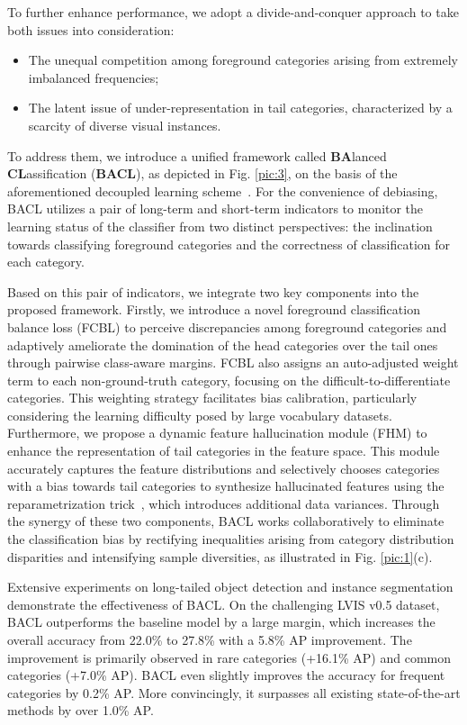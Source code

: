 \documentclass[lettersize,journal]{IEEEtran}
\begin{document}
To further enhance performance, we adopt a divide-and-conquer approach to take both issues into consideration:
\begin{itemize}
    \item The unequal competition among foreground categories arising from extremely imbalanced frequencies;
    \item The latent issue of under-representation in tail categories, characterized by a scarcity of diverse visual instances.
\end{itemize}
To address them, we introduce a unified framework called \textbf{BA}lanced \textbf{CL}assification (\textbf{BACL}), as depicted in Fig. \ref{pic:3}, on the basis of the aforementioned decoupled learning scheme~\cite{kang2019decoupling}.
For the convenience of debiasing, BACL utilizes a pair of long-term and short-term indicators to monitor the learning status of the classifier from two distinct perspectives: the inclination towards classifying foreground categories and the correctness of classification for each category.

Based on this pair of indicators, we integrate two key components into the proposed framework.
Firstly, we introduce a novel foreground classification balance loss (FCBL) to perceive discrepancies among foreground categories and adaptively ameliorate the domination of the head categories over the tail ones through pairwise class-aware margins.
FCBL also assigns an auto-adjusted weight term to each non-ground-truth category, focusing on the difficult-to-differentiate categories.
This weighting strategy facilitates bias calibration, particularly considering the learning difficulty posed by large vocabulary datasets. 
Furthermore, we propose a dynamic feature hallucination module (FHM) to enhance the representation of tail categories in the feature space. 
This module accurately captures the feature distributions and selectively chooses categories with a bias towards tail categories to synthesize hallucinated features using the reparametrization trick~\cite{kingma2013auto}, which introduces additional data variances.
Through the synergy of these two components, BACL works collaboratively to eliminate the classification bias by rectifying inequalities arising from category distribution disparities and intensifying sample diversities, as illustrated in Fig. \ref{pic:1}(c).




Extensive experiments on long-tailed object detection and instance segmentation demonstrate the effectiveness of BACL.
On the challenging LVIS v0.5 dataset, BACL outperforms the baseline model by a large margin, which increases the overall accuracy from 22.0\% to 27.8\% with a 5.8\% AP improvement.
The improvement is primarily observed in rare categories (+16.1\% AP) and common categories (+7.0\% AP).
BACL even slightly improves the accuracy for frequent categories by 0.2\% AP.
More convincingly, it surpasses all existing state-of-the-art methods by over 1.0\% AP.
\end{document}
